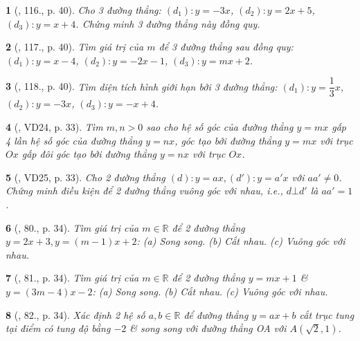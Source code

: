 \documentclass{article}
\newtheorem{baitoan}{}
\begin{document}
\begin{baitoan}[\cite{Tuyen_Toan_9_old}, 116., p. 40]
	Cho 3 đường thẳng: $(d_1):y = -3x$, $(d_2):y = 2x + 5$, $(d_3):y = x + 4$. Chứng minh 3 đường thẳng này đồng quy.
\end{baitoan}

\begin{baitoan}[\cite{Tuyen_Toan_9_old}, 117., p. 40]
	Tìm giá trị của $m$ để 3 đường thẳng sau đồng quy: $(d_1):y = x - 4$, $(d_2):y = -2x - 1$, $(d_3):y = mx + 2$.
\end{baitoan}

\begin{baitoan}[\cite{Tuyen_Toan_9_old}, 118., p. 40]
	Tìm diện tích hình giới hạn bởi 3 đường thẳng: $(d_1):y = \dfrac{1}{3}x$, $(d_2):y = -3x$, $(d_3):y = -x + 4$.
\end{baitoan}

\begin{baitoan}[\cite{Binh_Toan_9_tap_1}, VD24, p. 33]
	Tìm $m,n > 0$ sao cho hệ số góc của đường thẳng $y = mx$ gấp 4 lần hệ số góc của đường thẳng $y = nx$, góc tạo bởi đường thẳng $y = mx$ với trục $Ox$ gấp đôi góc tạo bởi đường thẳng $y = nx$ với trục $Ox$.
\end{baitoan}

\begin{baitoan}[\cite{Binh_Toan_9_tap_1}, VD25, p. 33]
	Cho 2 đường thẳng $(d):y = ax,(d'):y = a'x$ với $aa'\ne0$. Chứng minh điều kiện để 2 đường thẳng vuông góc với nhau, i.e., $d\bot d'$ là $aa' = 1$.
\end{baitoan}

\begin{baitoan}[\cite{Binh_Toan_9_tap_1}, 80., p. 34]
	Tìm giá trị của $m\in\mathbb{R}$ để 2 đường thẳng $y = 2x + 3,y = (m - 1)x + 2$: (a) Song song. (b) Cắt nhau. (c) Vuông góc với nhau.
\end{baitoan}

\begin{baitoan}[\cite{Binh_Toan_9_tap_1}, 81., p. 34]
	Tìm giá trị của $m\in\mathbb{R}$ để 2 đường thẳng $y = mx + 1$ \& $y = (3m - 4)x - 2$: (a) Song song. (b) Cắt nhau. (c) Vuông góc với nhau.
\end{baitoan}

\begin{baitoan}[\cite{Binh_Toan_9_tap_1}, 82., p. 34]
	Xác định 2 hệ số $a,b\in\mathbb{R}$ để đường thẳng $y = ax + b$ cắt trục tung tại điểm có tung độ bằng $-2$ \& song song với đường thẳng OA với $A(\sqrt{2},1)$.
\end{baitoan}
\end{document}
